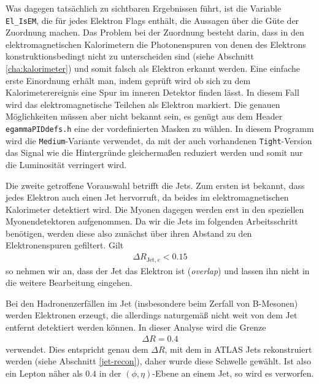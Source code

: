 \label{cha:isem}
Was dagegen tatsächlich zu sichtbaren Ergebnissen führt, ist die Variable
\lstinline'El_IsEM', die für jedes Elektron Flags enthält, die Aussagen über die
Güte der Zuordnung machen. Das Problem bei der Zuordnung besteht darin, dass in
den elektromagnetischen Kalorimetern die Photonenspuren von denen des Elektrons
konstruktionsbedingt nicht zu unterscheiden sind (siehe Abschnitt
\ref{cha:kalorimeter}) und somit falsch als Elektron erkannt werden. Eine
einfache erste Einordnung erhält man, indem geprüft wird ob sich zu dem
Kalorimeterereignis eine Spur im inneren Detektor finden lässt. In diesem Fall
wird das elektromagnetische Teilchen als Elektron markiert. Die genauen
Möglichkeiten müssen aber nicht bekannt sein, es genügt aus dem Header
\texttt{egammaPIDdefs.h} eine der vordefinierten Masken zu wählen. In diesem
Programm wird die \lstinline'Medium'-Variante verwendet, da mit der auch
vorhandenen \lstinline'Tight'-Version das Signal wie die Hintergründe
gleichermaßen reduziert werden und somit nur die Luminosität verringert wird.

Die zweite getroffene Vorauswahl betrifft die Jets. Zum ersten ist bekannt, dass
jedes Elektron auch einen Jet hervorruft, da beides im elektromagnetischen
Kalorimeter detektiert wird. Die Myonen dagegen werden erst in den speziellen
Myonendetektoren aufgenommen. Da wir die Jets im folgenden Arbeitsschritt
benötigen, werden diese also zunächst über ihren Abstand zu den Elektronenspuren
gefiltert. Gilt
\begin{align}
  \Delta R_{\text{Jet},e} < 0.15
\end{align}
so nehmen wir an, dass der Jet das Elektron ist (\emph{overlap}) und lassen ihn
nicht in die weitere Bearbeitung eingehen.

Bei den Hadronenzerfällen im Jet (insbesondere beim Zerfall von B-Mesonen)
werden Elektronen erzeugt, die allerdings naturgemäß nicht weit von dem Jet
entfernt detektiert werden können. In dieser Analyse wird die Grenze
\begin{align}
  \Delta R = 0.4
\end{align}
verwendet. Dies entspricht genau dem $\Delta R$, mit dem in ATLAS Jets
rekonstruiert werden (siehe Abschnitt \ref{jet-recon}), daher wurde diese
Schwelle gewählt. Ist also ein Lepton näher als $0.4$ in der $(\phi,
\eta)$-Ebene an einem Jet, so wird es verworfen.

